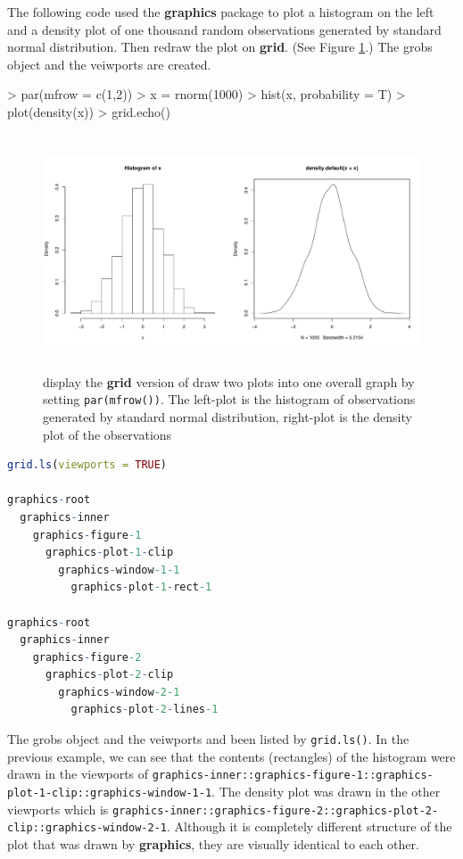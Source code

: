 \documentclass[11pt]{report}
\begin{document}
The following code used the \textbf{graphics} package to plot a histogram on the left and a density plot of one thousand random observations generated by standard normal distribution. Then redraw the plot on \textbf{grid}. (See Figure \ref{figure_4.1}.) The grobs object and the veiwports are created.
\begin{Schunk}
\begin{Sinput}
> par(mfrow = c(1,2))
> x = rnorm(1000)
> hist(x, probability = T)
> plot(density(x))
> grid.echo()
\end{Sinput}
\end{Schunk}
\begin{figure}[!h]
	\begin{center}
		\includegraphics[height = 7cm, width = 14cm]{figure/viewport_demo_1.pdf}
		\caption{display the \textbf{grid} version of draw two plots into one overall graph by setting \texttt{par(mfrow())}. The left-plot is the histogram of observations generated by standard normal distribution, right-plot is the density plot of the observations}
		\label{figure_4.1}
	\end{center}
\end{figure}

\newpage
\begin{lstlisting}[language = R]
grid.ls(viewports = TRUE)

graphics-root
  graphics-inner
    graphics-figure-1
      graphics-plot-1-clip
        graphics-window-1-1
          graphics-plot-1-rect-1

graphics-root
  graphics-inner
    graphics-figure-2
      graphics-plot-2-clip
        graphics-window-2-1
          graphics-plot-2-lines-1


\end{lstlisting}


The grobs object and the veiwports and been listed by \texttt{grid.ls()}. In the previous example, we can see that the contents (rectangles) of the histogram were drawn in the viewports of \texttt{graphics-inner::graphics-figure-1::graphics-plot-1-clip::graphics-window-1-1}. The density plot was drawn in the other viewports which is \texttt{graphics-inner::graphics-figure-2::graphics-plot-2-clip::graphics-window-2-1}. Although it is completely different structure of the plot that was drawn by \textbf{graphics}, they are visually identical to each other.\\
\end{document}
